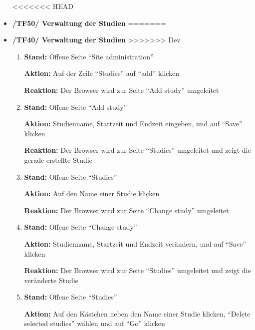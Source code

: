 \documentclass[a4paper]{scrreprt}
\begin{document}
\begin{itemize}
<<<<<<< HEAD
		                      \item \textbf{/TF50/ Verwaltung der Studien}
=======
		                      \item \textbf{/TF40/ Verwaltung der Studien}
>>>>>>> Dev
		                          \begin{enumerate}
		                              \item \par \textbf{Stand: }Offene Seite ``Site administration''
		                                    \par \textbf{Aktion: }Auf der Zeile ``Studies'' auf ``add'' klicken
		                                    \par \textbf{Reaktion: }Der Browser wird zur Seite ``Add study'' umgeleitet
		                              \item \par \textbf{Stand: }Offene Seite ``Add study''
		                                    \par \textbf{Aktion: }Studienname, Startzeit und Endzeit eingeben, und auf ``Save'' klicken
		                                    \par \textbf{Reaktion: }Der Browser wird zur Seite ``Studies'' umgeleitet und zeigt die gerade erstellte Studie
		                              \item \par \textbf{Stand: }Offene Seite ``Studies''
		                                    \par \textbf{Aktion: }Auf den Name einer Studie klicken
		                                    \par \textbf{Reaktion: }Der Browser wird zur Seite ``Change study'' umgeleitet
		                              \item \par \textbf{Stand: }Offene Seite ``Change study''
		                                    \par \textbf{Aktion: }Studienname, Startzeit und Endzeit ver\"andern, und auf ``Save'' klicken
		                                    \par \textbf{Reaktion: }Der Browser wird zur Seite ``Studies'' umgeleitet und zeigt die ver\"anderte Studie
		                              \item \par \textbf{Stand: }Offene Seite ``Studies''
		                                    \par \textbf{Aktion: }Auf den K\"astchen neben den Name einer Studie klicken, ``Delete selected studies'' w\"ahlen und auf ``Go'' klicken

\end{enumerate}
\end{itemize}
\end{document}
